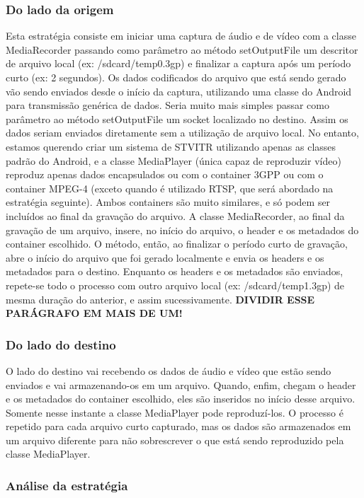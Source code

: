 \documentclass{acm_proc_article-sp}
\newcommand{\todo}[1]{\textcolor[rgb]{1.00,0.00,0.00}{\bf \uppercase{#1}}}
\begin{document}
\subsubsection{Do lado da origem}

Esta estratégia consiste em iniciar uma captura de áudio e de vídeo com a classe MediaRecorder passando como parâmetro ao método setOutputFile um descritor de arquivo local (ex: /sdcard/temp0.3gp) e finalizar a captura após um período curto (ex: 2 segundos). Os dados codificados do arquivo que está sendo gerado vão sendo enviados desde o início da captura, utilizando uma classe do Android para transmissão genérica de dados. Seria muito mais simples passar como parâmetro ao método setOutputFile um socket localizado no destino. Assim os dados seriam enviados diretamente sem a utilização de arquivo local. No entanto, estamos querendo criar um sistema de STVITR utilizando apenas as classes padrão do Android, e a classe MediaPlayer (única capaz de reproduzir vídeo) reproduz apenas dados encapsulados ou com o container 3GPP ou com o container MPEG-4 (exceto quando é utilizado RTSP, que será abordado na estratégia seguinte). Ambos containers são muito similares, e só podem ser incluídos ao final da gravação do arquivo. A classe MediaRecorder, ao final da gravação de um arquivo, insere, no início do arquivo, o header e os metadados do container escolhido. O método, então, ao finalizar o período curto de gravação, abre o início do arquivo que foi gerado localmente e envia os headers e os metadados para o destino. Enquanto os headers e os metadados são enviados, repete-se todo o processo com outro arquivo local (ex: /sdcard/temp1.3gp) de mesma duração do anterior, e assim sucessivamente. \todo{dividir esse parágrafo em mais de um!}

\subsubsection{Do lado do destino}

O lado do destino vai recebendo os dados de áudio e vídeo que estão sendo enviados e vai armazenando-os em um arquivo. Quando, enfim, chegam o header e os metadados do container escolhido, eles são inseridos no início desse arquivo. Somente nesse instante a classe MediaPlayer pode reproduzí-los. O processo é repetido para cada arquivo curto capturado, mas os dados são armazenados em um arquivo diferente para não sobrescrever o que está sendo reproduzido pela classe MediaPlayer.

\subsubsection{Análise da estratégia}
\end{document}
